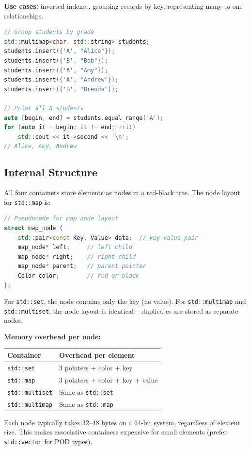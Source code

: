 \textbf{Use cases:} inverted indexes, grouping records by key, representing many-to-one relationships.

\begin{lstlisting}[language=C++]
// Group students by grade
std::multimap<char, std::string> students;
students.insert({'A', "Alice"});
students.insert({'B', "Bob"});
students.insert({'A', "Amy"});
students.insert({'A', "Andrew"});
students.insert({'B', "Brenda"});

// Print all A students
auto [begin, end] = students.equal_range('A');
for (auto it = begin; it != end; ++it)
    std::cout << it->second << '\n';
// Alice, Amy, Andrew
\end{lstlisting}

\subsection{Internal Structure}

All four containers store elements as nodes in a red-black tree. The node layout for \texttt{std::map} is:

\begin{lstlisting}[language=C++]
// Pseudocode for map node layout
struct map_node {
    std::pair<const Key, Value> data;  // key-value pair
    map_node* left;     // left child
    map_node* right;    // right child
    map_node* parent;   // parent pointer
    Color color;        // red or black
};
\end{lstlisting}

For \texttt{std::set}, the node contains only the key (no value). For \texttt{std::multimap} and \texttt{std::multiset}, the node layout is identical -- duplicates are stored as separate nodes.

\textbf{Memory overhead per node:}
\begin{center}
\begin{tabular}{ll}
\toprule
Container & Overhead per element \\
\midrule
\texttt{std::set} & 3 pointers + color + key \\
\texttt{std::map} & 3 pointers + color + key + value \\
\texttt{std::multiset} & Same as \texttt{std::set} \\
\texttt{std::multimap} & Same as \texttt{std::map} \\
\bottomrule
\end{tabular}
\end{center}

Each node typically takes 32--48 bytes on a 64-bit system, regardless of element size. This makes associative containers expensive for small elements (prefer \texttt{std::vector} for POD types).

